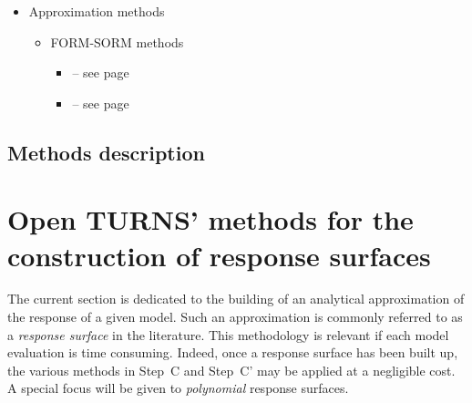 \begin{itemize}

\item Approximation methods
  \begin{itemize}
  \item FORM-SORM methods
    \begin{itemize}
    \item {}  -- see page \pageref{docref_Cprime31_ImportanceFactor} \vspace{2mm}
    \item {}  -- see page \pageref{docref_Cprime31_SensitivityFactor} \vspace{2mm}
    \end{itemize}
  \end{itemize}

\end{itemize}

\newpage

\subsection{Methods description}


\newpage

\newpage

\newpage

\newpage

\newpage

\newpage

\newpage

\newpage

\newpage

\section{Open TURNS' methods for the construction of response surfaces}

The current section is dedicated to the building of an analytical approximation of the response of a given model. Such an approximation is commonly referred to as a \emph{response surface} in the literature. This methodology is relevant if each model evaluation is time consuming. Indeed, once a response surface has been built up, the various methods in Step~C and Step~C' may be applied at a negligible cost. A special focus will be given to \emph{polynomial} response surfaces.



